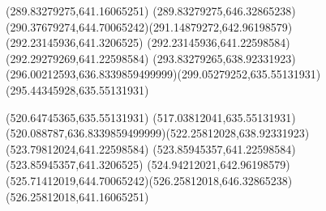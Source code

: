 {{%
\moveto(289.83279275,641.16065251)
\lineto(289.83279275,646.32865238)
\curveto(290.37679274,644.70065242)(291.14879272,642.96198579)(292.23145936,641.3206525)
\lineto(292.23145936,641.22598584)
\lineto(292.29279269,641.22598584)
\curveto(293.83279265,638.92331923)(296.00212593,636.8339859499999)(299.05279252,635.55131931)
\lineto(295.44345928,635.55131931)
\closepath

\moveto(520.64745365,635.55131931)
\lineto(517.03812041,635.55131931)
\curveto(520.088787,636.8339859499999)(522.25812028,638.92331923)(523.79812024,641.22598584)
\lineto(523.85945357,641.22598584)
\lineto(523.85945357,641.3206525)
\curveto(524.94212021,642.96198579)(525.71412019,644.70065242)(526.25812018,646.32865238)
\lineto(526.25812018,641.16065251)
\closepath
}
}

